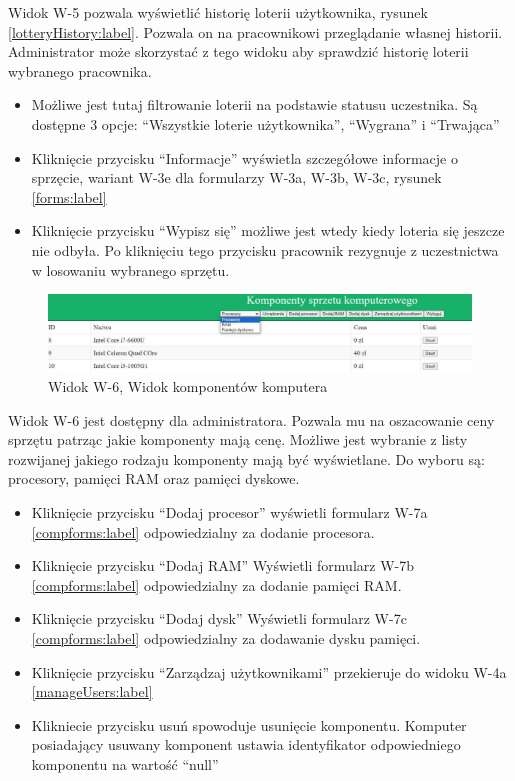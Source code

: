 Widok W-5 pozwala wyświetlić historię loterii użytkownika, rysunek \ref{lotteryHistory:label}. Pozwala on na pracownikowi przeglądanie własnej historii. Administrator może skorzystać z tego widoku aby sprawdzić historię loterii wybranego pracownika.
\begin {itemize}
	\item Możliwe jest tutaj filtrowanie loterii na podstawie statusu uczestnika. Są dostępne 3 opcje: "`Wszystkie loterie użytkownika"', "`Wygrana"' i "`Trwająca"'
	\item Kliknięcie przycisku "`Informacje"' wyświetla szczegółowe informacje o sprzęcie, wariant W-3e dla formularzy W-3a, W-3b, W-3c, rysunek \ref{forms:label} 
	\item Kliknięcie przycisku "`Wypisz się"' możliwe jest wtedy kiedy loteria się jeszcze nie odbyła. Po kliknięciu tego przycisku pracownik rezygnuje z uczestnictwa w losowaniu wybranego sprzętu.
\end{itemize} 




\begin{figure}[h]
		\centering
    \includegraphics[width=\linewidth]{rys05/view/components.pdf}
    \caption{Widok W-6, Widok komponentów komputera}
    \label{components:label}
\end{figure}

Widok W-6 jest dostępny dla administratora. Pozwala mu na oszacowanie ceny sprzętu patrząc jakie komponenty mają cenę. Możliwe jest wybranie z listy rozwijanej jakiego rodzaju komponenty mają być wyświetlane. Do wyboru są: procesory, pamięci RAM oraz pamięci dyskowe.
\begin{itemize}
	\item Kliknięcie przycisku "`Dodaj procesor"' wyświetli formularz W-7a \ref{compforms:label} odpowiedzialny za dodanie procesora.
	\item Kliknięcie przycisku "`Dodaj RAM"' Wyświetli formularz W-7b \ref{compforms:label} odpowiedzialny za dodanie pamięci RAM.
	\item Kliknięcie przycisku "`Dodaj dysk"' Wyświetli formularz W-7c \ref{compforms:label} odpowiedzialny za dodawanie dysku pamięci.
	\item Kliknięcie przycisku "`Zarządzaj użytkownikami"' przekieruje do widoku W-4a \ref{manageUsers:label}
	\item Klikniecie przycisku usuń spowoduje usunięcie komponentu. Komputer posiadający usuwany komponent ustawia identyfikator odpowiedniego komponentu na wartość "`null"'
\end{itemize} 


